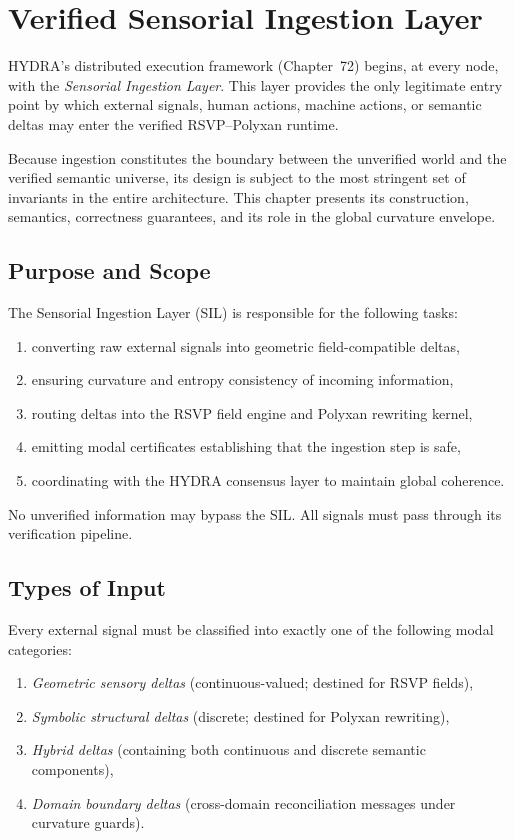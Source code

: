 \chapter{Verified Sensorial Ingestion Layer}
\label{ch:73}

HYDRA’s distributed execution framework (Chapter~72) begins, at every node, 
with the \emph{Sensorial Ingestion Layer}.  
This layer provides the only legitimate entry point by which external signals, 
human actions, machine actions, or semantic deltas may enter the verified 
RSVP--Polyxan runtime.

Because ingestion constitutes the boundary between the unverified world and the 
verified semantic universe, its design is subject to the most stringent set of 
invariants in the entire architecture.  
This chapter presents its construction, semantics, correctness guarantees, and 
its role in the global curvature envelope.

\section{Purpose and Scope}

The Sensorial Ingestion Layer (SIL) is responsible for the following tasks:
\begin{enumerate}
\item converting raw external signals into geometric field-compatible deltas,
\item ensuring curvature and entropy consistency of incoming information,
\item routing deltas into the RSVP field engine and Polyxan rewriting kernel,
\item emitting modal certificates establishing that the ingestion step is safe,
\item coordinating with the HYDRA consensus layer to maintain global coherence.
\end{enumerate}

No unverified information may bypass the SIL.  
All signals must pass through its verification pipeline.

\section{Types of Input}

Every external signal must be classified into exactly one of the following 
modal categories:

\begin{enumerate}
\item \emph{Geometric sensory deltas} 
      (continuous-valued; destined for RSVP fields),
\item \emph{Symbolic structural deltas} 
      (discrete; destined for Polyxan rewriting),
\item \emph{Hybrid deltas} 
      (containing both continuous and discrete semantic components),
\item \emph{Domain boundary deltas} 
      (cross-domain reconciliation messages under curvature guards).
\end{enumerate}

